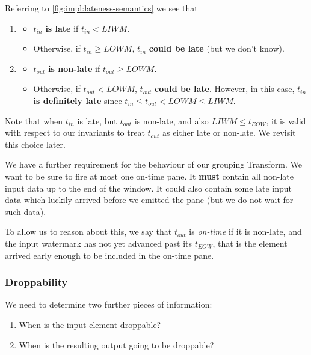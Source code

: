 Referring to \cref{fig:impl:lateness-semantics} we see that
\begin{enumerate}
	\item \begin{itemize}
	\item $t_{\mathit{in}}$ \textbf{is late} if $t_{\mathit{in}} < \mathit{LIWM}$.
	\item Otherwise, if $t_{\mathit{in}} \geq \mathit{LOWM}$, $t_{\mathit{in}}$ \textbf{could be late} (but we don't know).
	\end{itemize}
	\item \begin{itemize}
	\item $t_{\mathit{out}}$ \textbf{is non-late} if $t_{\mathit{out}} \geq \mathit{LOWM}$.
	\item Otherwise, if $t_{\mathit{out}} < \mathit{LOWM}$, $t_{\mathit{out}}$ \textbf{could be late}. However, in this case, $t_{\mathit{in}}$ \textbf{is definitely late} since $t_{\mathit{in}} \leq t_{\mathit{out}} < \mathit{LOWM} \leq \mathit{LIWM}$.
	\end{itemize}
\end{enumerate}

Note that when $t_{\mathit{in}}$ is late, but $t_{\mathit{out}}$ is non-late, and also $\mathit{LIWM} \leq t_{\mathit{EOW}}$, it is valid with respect to our invariants to treat $t_{\mathit{out}}$ as either late or non-late.
We revisit this choice later.

We have a further requirement for the behaviour of our grouping Transform.
We want to be sure to fire at most one on-time pane.
It \textbf{must} contain all non-late input data up to the end of the window.
It could also contain some late input data which luckily arrived before we emitted the pane (but we do not wait for such data).

To allow us to reason about this, we say that $t_{\mathit{out}}$ is \emph{on-time} if it is non-late, and the input watermark has not yet advanced past its $t_{\mathit{EOW}}$, that is the element arrived early enough to be included in the on-time pane.

\subsubsection{Droppability}

We need to determine two further pieces of information:
\begin{enumerate}
	\item When is the input element droppable?
	\item When is the resulting output going to be droppable?
\end{enumerate}

